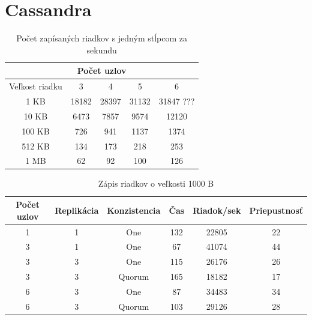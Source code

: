 \documentclass[11pt,twoside,a4paper]{book}
\begin{document}
\section{Cassandra}

\begin{table}[htbp]
\begin{center}
\begin{tabular}{|c|c|c|c|c|}
\hline
\multicolumn{5}{|c|}{Počet uzlov}  \\
\hline Veľkost riadku & 3 & 4 & 5 & 6\\ 
\hline
\hline 1 KB & 18182 & 28397 & 31132 & 31847 ???\\ 
\hline 10 KB & 6473 & 7857 & 9574 & 12120\\ 
\hline 100 KB & 726 & 941 & 1137 & 1374\\ 
\hline 512 KB & 134 & 173 & 218 & 253\\  
\hline 1 MB & 62 & 92 & 100 & 126\\ 
\hline
\end{tabular} 
\end{center}
\caption{Počet zapísaných riadkov s jedným stĺpcom za sekundu}
\label{tab:CPerf1}
\end{table}





\begin{table}[htbp]
\begin{center}
\begin{tabular}{|c|c|c|c|c|c|}
\hline

\hline Počet uzlov & Replikácia & Konzistencia & Čas & Riadok/sek & Priepustnosť\\ 
\hline
\hline 1 & 1 & One & 132 & 22805 & 22\\ 
\hline 3 & 1 & One & 67 & 41074 & 44\\ 
\hline 3 & 3 & One & 115 & 26176 & 26\\ 
\hline 3 & 3 & Quorum & 165 & 18182 & 17\\ 
\hline 6 & 3 & One & 87 & 34483 & 34\\ 
\hline 6 & 3 & Quorum & 103 & 29126 & 28\\ 
\hline
\end{tabular} 
\end{center}
\caption{Zápis riadkov o veľkosti 1000 B}
\label{tab:CPerf2}
\end{table}
\end{document}
